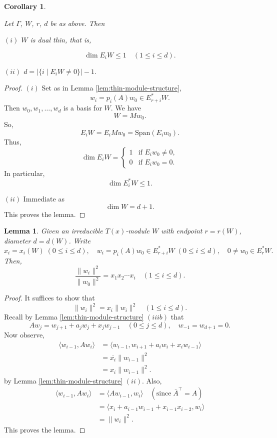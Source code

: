 \documentclass[
]{book}
\newtheorem{lemma}{Lemma}[chapter]
\newtheorem{corollary}{Corollary}[chapter]
\theoremstyle{definition}
\theoremstyle{definition}
\theoremstyle{definition}
\theoremstyle{definition}
\theoremstyle{remark}
\begin{document}
\begin{corollary}
\protect\hypertarget{cor:thin-is-dualthin}{}\label{cor:thin-is-dualthin}

Let \(\Gamma\), \(W\), \(r\), \(d\) be as above. Then

\((i)\) \(W\) is dual thin, that is,

\[\dim E_iW \leq 1 \quad (1\leq i \leq d).\]

\((ii)\) \(d = |\{i \mid E_iW \neq 0\}| - 1.\)

\end{corollary}

\begin{proof}
\((i)\) Set as in Lemma \ref{lem:thin-module-structure},
\[w_i = p_i(A)w_0\in E^*_{r+i}W.\]
Then \(w_0, w_1, \ldots, w_d\) is a basis for \(W\). We have
\[W = Mw_0.\]
So,
\[E_iW = E_iMw_0 = \mathrm{Span}(E_iw_0).\]
Thus,
\[\dim E_iW = \begin{cases}1 & \text{if } E_iw_0\neq 0,\\ 0 & \text{if }E_iw_0 = 0.\end{cases}\]
In particular,
\[\dim E^*_iW \leq 1.\]

\((ii)\) Immediate as
\[\dim W = d+1.\]
This proves the lemma.
\end{proof}

\begin{lemma}
\protect\hypertarget{lem:measure-wi}{}\label{lem:measure-wi}Given an irreducible \(T(x)\)-module \(W\) with endpoint \(r = r(W)\), diameter \(d = d(W)\). Write
\[x_i = x_i(W) \; (0\leq i\leq d), \quad w_i = p_i(A)w_0\in E^*_{r+i}W \; (0\leq i\leq d), \quad 0\neq w_0 \in E^*_rW.\]
Then,
\[\frac{\|w_i\|^2}{\|w_0\|^2} = x_1x_2\cdots x_i \quad (1\leq i\leq d).\]
\end{lemma}

\begin{proof}
It suffices to show that
\[\|w_i\|^2 = x_i\|w_i\|^2 \quad (1\leq i\leq d).\]
Recall by Lemma \ref{lem:thin-module-structure} \((iiib)\) that
\[Aw_j = w_{j+1} + a_jw_j + x_jw_{j-1} \quad (0\leq j\leq d), \quad w_{-1} = w_{d+1} = 0.\]
Now observe,
\begin{align}
\langle w_{i-1}, Aw_i\rangle & = \langle w_{i-1}, w_{i+1}+ a_iw_i + x_iw_{i-1}\rangle\\
& = \overline{x_i}\|w_{i-1}\|^2\\
& = x_i\|w_{i-1}\|^2.
\end{align}
by Lemma \ref{lem:thin-module-structure} \((ii)\).
Also,
\begin{align}
\langle w_{i-1}, Aw_i\rangle & = \langle Aw_{i-1}, w_i\rangle \quad (\text{since}\; \bar{A}^\top = A)\\
& = \langle x_i + a_{i-1}w_{i-1} + x_{i-1}x_{i-2}, w_i\rangle\\
& = \|w_i\|^2.
\end{align}
This proves the lemma.
\end{proof}
\end{document}
